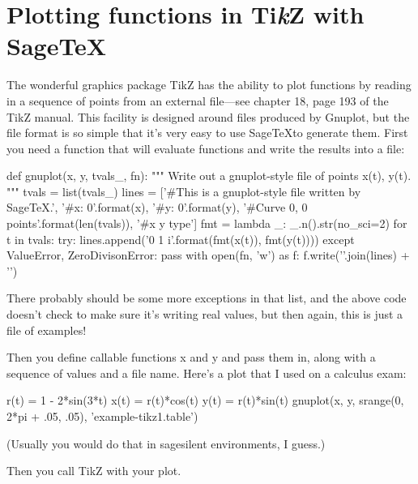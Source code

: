 \documentclass{article}
\begin{document}
\section{Plotting functions in Ti\emph{k}Z with Sage\TeX}

The wonderful graphics package TikZ has the ability to plot functions by
reading in a sequence of points from an external file---see chapter 18,
page 193 of the TikZ manual. This facility is designed around files
produced by Gnuplot, but the file format is so simple that it's very
easy to use Sage\TeX to generate them. First you need a function that
will evaluate functions and write the results into a file:


\begin{sageblock}
  def gnuplot(x, y, tvals_, fn):
      """
      Write out a gnuplot-style file of points x(t), y(t).
      """
      tvals = list(tvals_)
      lines = ['#This is a gnuplot-style file written by SageTeX.',
               '#x: {0}'.format(x),
               '#y: {0}'.format(y),
               '#Curve 0, {0} points'.format(len(tvals)),
               '#x y type']
      fmt = lambda _: _.n().str(no_sci=2)
      for t in tvals:
          try:
              lines.append('{0} {1}  i'.format(fmt(x(t)), fmt(y(t))))
          except ValueError, ZeroDivisonError:
              pass
      with open(fn, 'w') as f:
          f.write('\n'.join(lines) + '\n')
\end{sageblock}

There probably should be some more exceptions in that list, and the
above code doesn't check to make sure it's writing real values, but then
again, this is just a file of examples!

Then you define callable functions x and y and pass them in, along with
a sequence of values and a file name. Here's a plot that I used on a
calculus exam:

\begin{sageblock}
  r(t) = 1 - 2*sin(3*t)
  x(t) = r(t)*cos(t)
  y(t) = r(t)*sin(t)
  gnuplot(x, y, srange(0, 2*pi + .05, .05), 'example-tikz1.table')
\end{sageblock}

(Usually you would do that in sagesilent environments, I guess.)

Then you call TikZ with your plot.

\end{document}
